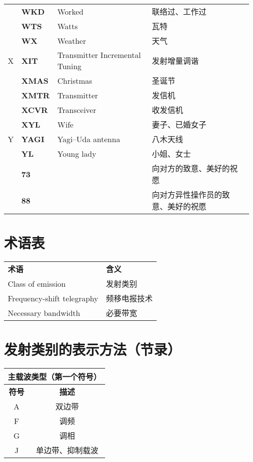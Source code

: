 \begin{longtable}[l]{llll}
& \textbf{WKD} & Worked & 联络过、工作过 \\
& \textbf{WTS} & Watts & 瓦特 \\
& \textbf{WX} & Weather & 天气 \\
X & \textbf{XIT} & Transmitter Incremental Tuning & 发射增量调谐 \\
& \textbf{XMAS} & Christmas & 圣诞节 \\
& \textbf{XMTR} & Transmitter & 发信机 \\
& \textbf{XCVR} & Transceiver & 收发信机 \\
& \textbf{XYL} & Wife & 妻子、已婚女子 \\
Y & \textbf{YAGI} & Yagi–Uda antenna & 八木天线 \\
& \textbf{YL} & Young lady & 小姐、女士 \\
& \textbf{73} & & 向对方的致意、美好的祝愿 \\
& \textbf{88} & & 向对方异性操作员的致意、美好的祝愿 \\
\end{longtable}

\newpage



\section{术语表}

\begin{longtable}[l]{ll}
	\textbf{术语} & \textbf{含义} \\
	Class of emission & 发射类别 \\
	Frequency-shift telegraphy & 频移电报技术\\
	Necessary bandwidth & 必要带宽 \\
\end{longtable}

\newpage



\section{发射类别的表示方法（节录）}

\begin{tabular}{|c|c|}
	\hline
	\multicolumn{2}{|c|}{\textbf{主载波类型（第一个符号）}} \\
	\hline
	\textbf{符号} & \textbf{描述} \\
	\hline
	A & 双边带 \\
	\hline
	F & 调频 \\
	\hline
	G & 调相 \\
	\hline
	J & 单边带、抑制载波 \\
	\hline
\end{tabular}

